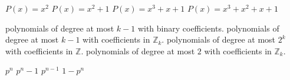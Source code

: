  
 {$P(x)=x^2$}
 {$P(x)=x^2+1$}
 {$P(x)=x^3+x+1$}
 {$P(x)=x^3+x^2+x+1$}
 
 {polynomials of degree at most $k-1$ with binary coefficients.}
 {polynomials of degree at most $k-1$ with coefficients in $\mathbb{Z}_k$.}
 {polynomials of degree at most $2^k$ with coefficients in $\mathbb{Z}$.}
 {polynomials of degree at most $2$ with coefficients in $\mathbb{Z}_k$.}
 
{$p^n$}
{$p^n-1$}
{$p^{n-1}$} 
{$1-p^n$}